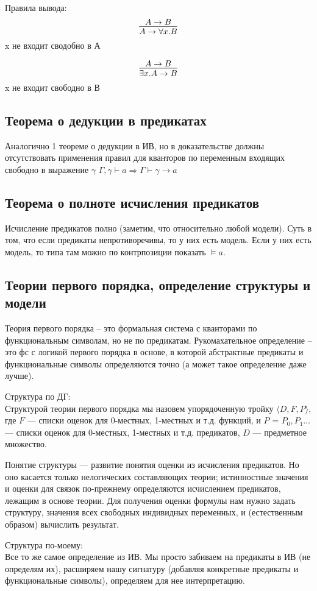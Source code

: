 Правила вывода:
\[\infer{A \to \forall x . B}{A \to B}\]
 x не входит сводобно в А

\[\infer{\exists x . A \to B}{A \to B}\]
 x не входит свободно в В
\subsection{Теорема о дедукции в предикатах}
\label{sec-2-16}
Аналогично 1 теореме о дедукции в ИВ, но в доказательстве должны
отсутствовать применения правил для кванторов по переменным входящих
свободно в выражение $\gamma$
$\Gamma, \gamma \vdash a \Rightarrow \Gamma \vdash \gamma \to a$
\subsection{Теорема о полноте исчисления предикатов}
\label{sec-2-17}
Исчисление предикатов полно (заметим, что относительно любой модели).
Суть в том, что если предикаты непротиворечивы, то у них есть модель.
Если у них есть модель, то типа там можно по контрпозиции показать $\vDash a$.
\subsection{Теории первого порядка, определение структуры и модели}
\label{sec-2-18}
Теория первого порядка -- это формальная система с кванторами по
функциональным символам, но не по предикатам. Рукомахательное
определение – это фс с логикой первого порядка в основе, в которой
абстрактные предикаты и функциональные символы определяются точно
(а может такое определение даже лучше).

Структура по ДГ:\\
Структурой теории первого порядка мы назовем упорядоченную тройку
$\langle D, F, P\rangle$, где $F$ — списки оценок для 0-местных, 1-местных и т.д.
функций, и $P$ = $P_{0}, P_{1} \ldots$ — списки оценок для 0-местных,
1-местных и т.д. предикатов, $D$ — предметное множество.

Понятие структуры — развитие понятия оценки из исчисления предикатов.
Но оно касается только нелогических составляющих теории; истинностные
значения и оценки для связок по-прежнему определяются исчислением
предикатов, лежащим в основе теории. Для получения оценки формулы
нам нужно задать структуру, значения всех свободных индивидных
переменных, и (естественным образом) вычислить результат.

Структура по-моему:\\
Все то же самое определение из ИВ. Мы просто забиваем на предикаты
в ИВ (не определям их), расширяем нашу сигнатуру (добавляя конкретные
предикаты и функциональные символы), определяем для нее интерпретацию.

